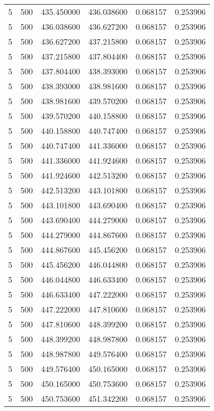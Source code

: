 \begin{longtable}{rrrrrr}
5 & 500 & 435.450000 & 436.038600 & 0.068157 & 0.253906 \\
5 & 500 & 436.038600 & 436.627200 & 0.068157 & 0.253906 \\
5 & 500 & 436.627200 & 437.215800 & 0.068157 & 0.253906 \\
5 & 500 & 437.215800 & 437.804400 & 0.068157 & 0.253906 \\
5 & 500 & 437.804400 & 438.393000 & 0.068157 & 0.253906 \\
5 & 500 & 438.393000 & 438.981600 & 0.068157 & 0.253906 \\
5 & 500 & 438.981600 & 439.570200 & 0.068157 & 0.253906 \\
5 & 500 & 439.570200 & 440.158800 & 0.068157 & 0.253906 \\
5 & 500 & 440.158800 & 440.747400 & 0.068157 & 0.253906 \\
5 & 500 & 440.747400 & 441.336000 & 0.068157 & 0.253906 \\
5 & 500 & 441.336000 & 441.924600 & 0.068157 & 0.253906 \\
5 & 500 & 441.924600 & 442.513200 & 0.068157 & 0.253906 \\
5 & 500 & 442.513200 & 443.101800 & 0.068157 & 0.253906 \\
5 & 500 & 443.101800 & 443.690400 & 0.068157 & 0.253906 \\
5 & 500 & 443.690400 & 444.279000 & 0.068157 & 0.253906 \\
5 & 500 & 444.279000 & 444.867600 & 0.068157 & 0.253906 \\
5 & 500 & 444.867600 & 445.456200 & 0.068157 & 0.253906 \\
5 & 500 & 445.456200 & 446.044800 & 0.068157 & 0.253906 \\
5 & 500 & 446.044800 & 446.633400 & 0.068157 & 0.253906 \\
5 & 500 & 446.633400 & 447.222000 & 0.068157 & 0.253906 \\
5 & 500 & 447.222000 & 447.810600 & 0.068157 & 0.253906 \\
5 & 500 & 447.810600 & 448.399200 & 0.068157 & 0.253906 \\
5 & 500 & 448.399200 & 448.987800 & 0.068157 & 0.253906 \\
5 & 500 & 448.987800 & 449.576400 & 0.068157 & 0.253906 \\
5 & 500 & 449.576400 & 450.165000 & 0.068157 & 0.253906 \\
5 & 500 & 450.165000 & 450.753600 & 0.068157 & 0.253906 \\
5 & 500 & 450.753600 & 451.342200 & 0.068157 & 0.253906 \\

\end{longtable}

